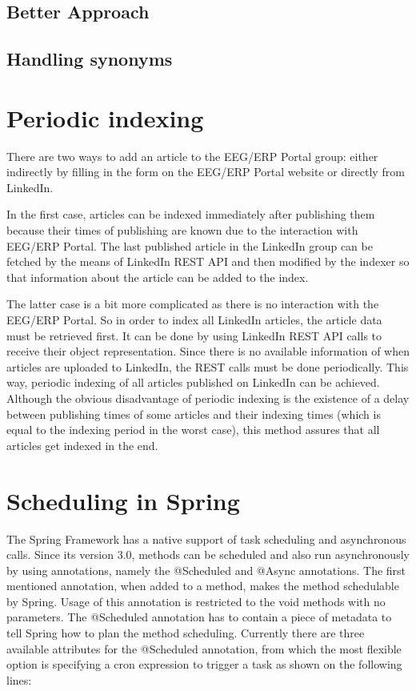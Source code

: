\documentclass[12pt, oneside, a4paper]{book}
\begin{document}
\subsection{Better Approach}


\subsection{Handling synonyms}

\section{Periodic indexing}

There are two ways to add an article to the EEG/ERP Portal group: either indirectly by filling in the form on the EEG/ERP Portal website or directly from LinkedIn.

In the first case, articles can be indexed immediately after publishing them because their times of publishing are known due to the interaction with EEG/ERP Portal. 
The last published article in the LinkedIn group can be fetched by the means of LinkedIn REST API and then modified by the indexer so that information about the article can be added to the index.

The latter case is a bit more complicated as there is no interaction with the EEG/ERP Portal. 
So in order to index all LinkedIn articles, the article data must be retrieved first.
It can be done by using LinkedIn REST API calls to receive their object representation.
Since there is no available information of when articles are uploaded to LinkedIn, the REST calls must be done periodically.
This way, periodic indexing of all articles published on LinkedIn can be achieved.
Although the obvious disadvantage of periodic indexing is the existence of a delay between publishing times of some articles and their indexing times (which is equal to the indexing period in the worst case), this method assures that all articles get indexed in the end.

\section{Scheduling in Spring}

The Spring Framework has a native support of task scheduling and asynchronous calls. 
Since its version 3.0, methods can be scheduled and also run asynchronously by using annotations, namely the @Scheduled and @Async
annotations. 
The first mentioned annotation, when added to a method, makes the method schedulable by Spring. 
Usage of this annotation is restricted to the void methods with no parameters. 
The @Scheduled annotation has to contain a piece of metadata to tell Spring how to plan the method scheduling. 
Currently there are three available attributes for the @Scheduled annotation, from which the most flexible option is specifying a cron expression to trigger a task as shown on the following lines:
\end{document}
